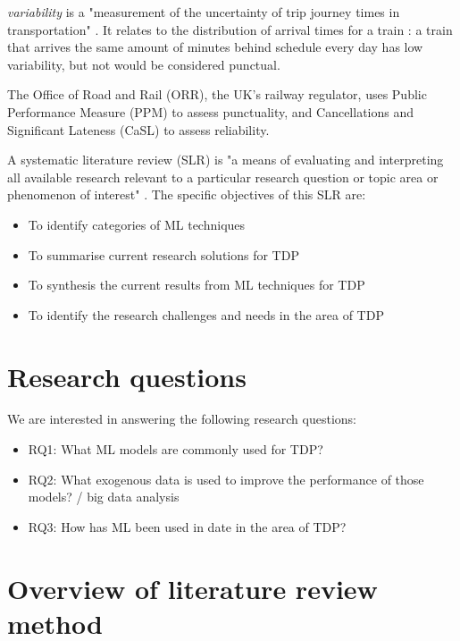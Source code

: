\documentclass{article}
\begin{document}
\textit{variability} is a "measurement of the uncertainty of trip journey times in transportation" \cite{olsson_haugland_2004}. It relates to the distribution of arrival times for a train \cite{noland_polak_2002}:
a train that arrives the same amount of minutes behind schedule every day has low variability, but not would be considered punctual.

The Office of Road and Rail (ORR), the UK's railway regulator, uses Public Performance Measure (PPM) to assess punctuality, and Cancellations and Significant Lateness (CaSL) to assess reliability.

A systematic literature review (SLR) is "a means of evaluating and interpreting all available research relevant to a particular research question or topic area or phenomenon of interest" \cite{williams_hollingsworth_2005}. The specific objectives of this SLR are:

\begin{itemize}
	\item To identify categories of ML techniques
	\item To summarise current research solutions for TDP
	\item To synthesis the current results from ML techniques for TDP
	\item To identify the research challenges and needs in the area of TDP
\end{itemize}

\section{Research questions}

We are interested in answering the following research questions:

\begin{itemize}
	\item RQ1: What ML models are commonly used for TDP?
	\item RQ2: What exogenous data is used to improve the performance of those models? / big data analysis
	\item RQ3: How has ML been used in date in the area of TDP?
\end{itemize}

\clearpage
\section{Overview of literature review\\method}
\end{document}
